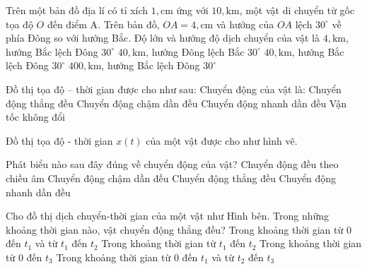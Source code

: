 \begin{ex}
Trên một bản đồ địa lí có tỉ xích $1,\mathrm{cm}$ ứng với $10,\mathrm{km}$, một vật di chuyển từ gốc tọa độ $O$ đến điểm A. Trên bản đồ, $OA=4,\mathrm{cm}$ và hướng của $OA$ lệch $30^\circ$ về phía Đông so với hướng Bắc. Độ lớn và hướng độ dịch chuyển của vật là
\choice
{$4,\mathrm{km}$, hướng Bắc lệch Đông $30^\circ$}
{$40,\mathrm{km}$, hướng Đông lệch Bắc $30^\circ$}
{\True $40,\mathrm{km}$, hướng Bắc lệch Đông $30^\circ$}
{$400,\mathrm{km}$, hướng Bắc lệch Đông $30^\circ$}
\end{ex}

\begin{ex}
Đồ thị tọa độ – thời gian được cho như sau:
	Chuyển động của vật là:
\choice
{Chuyển động thẳng đều}
{Chuyển động chậm dần đều}
{\True Chuyển động nhanh dần đều}
{Vận tốc không đổi}
\end{ex}

\begin{ex}
Đồ thị tọa độ - thời gian $x(t)$ của một vật được cho như hình vẽ.
	
	Phát biểu nào sau đây đúng về chuyển động của vật?
\choice
{Chuyển động đều theo chiều âm}
{Chuyển động chậm dần đều}
{\True Chuyển động thẳng đều}
{Chuyển động nhanh dần đều}
\end{ex}

\begin{ex}
Cho đồ thị dịch chuyển-thời gian của một vật như Hình bên. Trong những khoảng thời gian nào, vật chuyển động thẳng đều?
\choice
{Trong khoảng thời gian từ 0 đến $t_1$ và từ $t_1$ đến $t_2$}
{Trong khoảng thời gian từ $t_1$ đến $t_2$}
{Trong khoảng thời gian từ 0 đến $t_3$}
{\True Trong khoảng thời gian từ 0 đến $t_1$ và từ $t_2$ đến $t_3$}
\end{ex}


